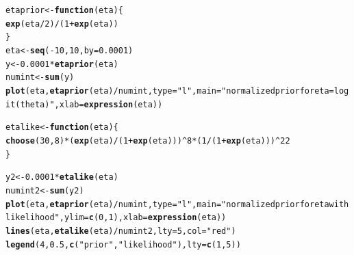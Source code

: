 \documentclass[12pt]{article}\usepackage[]{graphicx}\usepackage[]{color}
\makeatletter
\newcommand{\hlnum}[1]{\textcolor[rgb]{0.686,0.059,0.569}{#1}}%
\newcommand{\hlstr}[1]{\textcolor[rgb]{0.192,0.494,0.8}{#1}}%
\newcommand{\hlopt}[1]{\textcolor[rgb]{0,0,0}{#1}}%
\newcommand{\hlstd}[1]{\textcolor[rgb]{0.345,0.345,0.345}{#1}}%
\newcommand{\hlkwa}[1]{\textcolor[rgb]{0.161,0.373,0.58}{\textbf{#1}}}%
\newcommand{\hlkwb}[1]{\textcolor[rgb]{0.69,0.353,0.396}{#1}}%
\newcommand{\hlkwc}[1]{\textcolor[rgb]{0.333,0.667,0.333}{#1}}%
\newcommand{\hlkwd}[1]{\textcolor[rgb]{0.737,0.353,0.396}{\textbf{#1}}}%
\newenvironment{kframe}{%
 \def\at@end@of@kframe{}%
 \ifinner\ifhmode%
  \def\at@end@of@kframe{\end{minipage}}%
  \begin{minipage}{\columnwidth}%
 \fi\fi%
 \def\FrameCommand##1{\hskip\@totalleftmargin \hskip-\fboxsep
 \colorbox{shadecolor}{##1}\hskip-\fboxsep
     \hskip-\linewidth \hskip-\@totalleftmargin \hskip\columnwidth}%
 \MakeFramed {\advance\hsize-\width
   \@totalleftmargin\z@ \linewidth\hsize
   \@setminipage}}%
 {\par\unskip\endMakeFramed%
 \at@end@of@kframe}
\newenvironment{knitrout}{}{} %
\makeatother
\begin{document}
\begin{knitrout}\footnotesize
{}\color{fgcolor}\begin{kframe}
\begin{alltt}
\hlstd{etaprior} \hlkwb{<-} \hlkwa{function}\hlstd{(}\hlkwc{eta}\hlstd{) \{}
  \hlkwd{exp}\hlstd{(eta}\hlopt{/}\hlnum{2}\hlstd{)}\hlopt{/}\hlstd{(}\hlnum{1}\hlopt{+}\hlkwd{exp}\hlstd{(eta))}
\hlstd{\}}
\hlstd{eta} \hlkwb{<-} \hlkwd{seq}\hlstd{(}\hlopt{-}\hlnum{10}\hlstd{,} \hlnum{10}\hlstd{,} \hlkwc{by}\hlstd{=}\hlnum{0.0001}\hlstd{)}
\hlstd{y} \hlkwb{<-} \hlnum{0.0001}\hlopt{*}\hlkwd{etaprior}\hlstd{(eta)}
\hlstd{numint} \hlkwb{<-} \hlkwd{sum}\hlstd{(y)}
\hlkwd{plot}\hlstd{(eta,} \hlkwd{etaprior}\hlstd{(eta)}\hlopt{/}\hlstd{numint,} \hlkwc{type}\hlstd{=}\hlstr{"l"}\hlstd{,} \hlkwc{main}\hlstd{=}\hlstr{"normalized prior for eta=logit(theta)"}\hlstd{,} \hlkwc{xlab}\hlstd{=}\hlkwd{expression}\hlstd{(eta))}
\end{alltt}
\end{kframe}
\end{knitrout}

\begin{knitrout}\footnotesize
{}\color{fgcolor}\begin{kframe}
\begin{alltt}
\hlstd{etalike} \hlkwb{<-} \hlkwa{function}\hlstd{(}\hlkwc{eta}\hlstd{)\{}
  \hlkwd{choose}\hlstd{(}\hlnum{30}\hlstd{,} \hlnum{8}\hlstd{)}\hlopt{*}\hlstd{(}\hlkwd{exp}\hlstd{(eta)}\hlopt{/}\hlstd{(}\hlnum{1}\hlopt{+}\hlkwd{exp}\hlstd{(eta)))}\hlopt{^}\hlnum{8}\hlopt{*}\hlstd{(}\hlnum{1}\hlopt{/}\hlstd{(}\hlnum{1}\hlopt{+}\hlkwd{exp}\hlstd{(eta)))}\hlopt{^}\hlnum{22}
\hlstd{\}}
\end{alltt}
\end{kframe}
\end{knitrout}

\begin{knitrout}\footnotesize
{}\color{fgcolor}\begin{kframe}
\begin{alltt}
\hlstd{y2} \hlkwb{<-} \hlnum{0.0001}\hlopt{*}\hlkwd{etalike}\hlstd{(eta)}
\hlstd{numint2} \hlkwb{<-} \hlkwd{sum}\hlstd{(y2)}
\hlkwd{plot}\hlstd{(eta,} \hlkwd{etaprior}\hlstd{(eta)}\hlopt{/}\hlstd{numint,} \hlkwc{type}\hlstd{=}\hlstr{"l"}\hlstd{,} \hlkwc{main}\hlstd{=}\hlstr{"normalized prior for eta with likelihood"}\hlstd{,} \hlkwc{ylim}\hlstd{=}\hlkwd{c}\hlstd{(}\hlnum{0}\hlstd{,}\hlnum{1}\hlstd{),} \hlkwc{xlab}\hlstd{=}\hlkwd{expression}\hlstd{(eta))}
\hlkwd{lines}\hlstd{(eta,} \hlkwd{etalike}\hlstd{(eta)}\hlopt{/}\hlstd{numint2,} \hlkwc{lty}\hlstd{=}\hlnum{5}\hlstd{,} \hlkwc{col}\hlstd{=}\hlstr{"red"}\hlstd{)}
\hlkwd{legend}\hlstd{(}\hlnum{4}\hlstd{,} \hlnum{0.5}\hlstd{,} \hlkwd{c}\hlstd{(}\hlstr{"prior"}\hlstd{,} \hlstr{"likelihood"}\hlstd{),} \hlkwc{lty}\hlstd{=}\hlkwd{c}\hlstd{(}\hlnum{1}\hlstd{,}\hlnum{5}\hlstd{))}
\end{alltt}
\end{kframe}
\end{knitrout}
\end{document}
